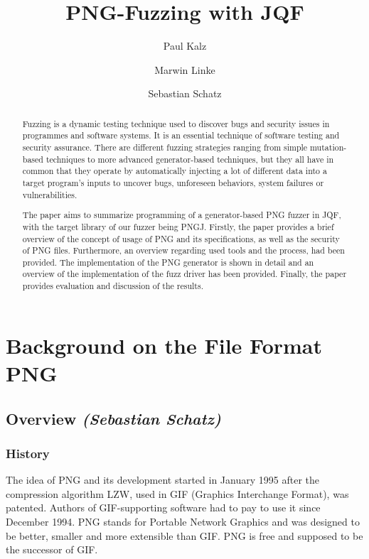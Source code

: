 \documentclass[runningheads]{llncs}
\begin{document}
%
\title{PNG-Fuzzing with JQF}
%
%
\author{Paul Kalz \and Marwin Linke \and Sebastian Schatz}
%
\maketitle              %
%
\begin{abstract}
Fuzzing is a dynamic testing technique used to discover bugs and
security issues in programmes and software systems. It is an essential
technique of software testing and security assurance. There are different
fuzzing strategies ranging from simple mutation-based techniques to more
advanced generator-based techniques, but they all have in common that
they operate by automatically injecting a lot of different data into a target
program's inputs to uncover bugs, unforeseen behaviors, system failures or
vulnerabilities.

The paper aims to summarize programming of a generator-based PNG fuzzer
in JQF, with the target library of our fuzzer being PNGJ. Firstly, the paper
provides a brief overview of the concept of usage of PNG and its
specifications, as well as the security of PNG files. Furthermore, an overview
regarding used tools and the process, had been provided. The
implementation of the PNG generator is shown in detail and an overview of
the implementation of the fuzz driver has been provided. Finally, the paper
provides evaluation and discussion of the results.

\end{abstract}
%
%
%
\section{Background on the File Format PNG}
\subsection{Overview \normalfont\textit{(Sebastian Schatz)}}

\subsubsection{History}
The idea of PNG and its development started in January 1995 after the
compression algorithm LZW, used in GIF (Graphics Interchange Format), was
patented. Authors of GIF-supporting software had to pay to use it since
December 1994. PNG stands for Portable Network Graphics and was designed to be better, smaller
and more extensible than GIF. PNG is free and supposed to be the successor of
GIF.
\end{document}
